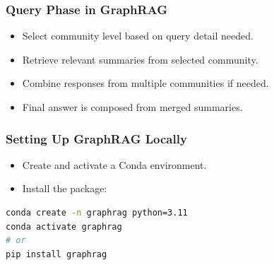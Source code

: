 
	

	


\begin{frame}[fragile]\frametitle{Query Phase in GraphRAG}
  \begin{itemize}
    \item Select community level based on query detail needed.
    \item Retrieve relevant summaries from selected community.
    \item Combine responses from multiple communities if needed.
    \item Final answer is composed from merged summaries.
  \end{itemize}
\end{frame}



\begin{frame}[fragile]\frametitle{Setting Up GraphRAG Locally}
  \begin{itemize}
    \item Create and activate a Conda environment.
    \item Install the package:
  \end{itemize}
	
    \begin{lstlisting}[language=bash]
conda create -n graphrag python=3.11
conda activate graphrag
# or
pip install graphrag
    \end{lstlisting}
\end{frame}




